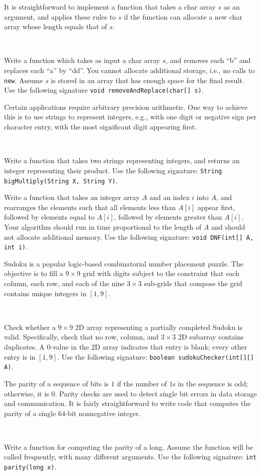 \documentclass{jhwhw}
\newcommand{\myindex}[1]{%
}
\newcommand{\task}{%
\mbox{ }\\ %
\noindent{\bf Task:}
}
\begin{document}
It is straightforward to implement a function that takes a char \myindex{string}array $s$ as an argument,
and applies these rules to $s$ if the function can allocate a new char array whose length equals that of $s$.

\task
Write a function which takes as input a \myindex{string}char array $s$, and
removes each ``b'' and replaces each ``a'' by ``dd''.
You cannot allocate additional storage, i.e., no calls to \texttt{new}.
Assume $s$ is stored in an \myindex{array}array that has enough space for the final result.
Use the following signature \texttt{void removeAndReplace(char[] s)}.


Certain applications require arbitrary precision arithmetic.
One way to achieve this is to use \myindex{string}strings to represent
integers, e.g., with one digit or negative sign per character entry, with the most significant
digit appearing first.

\task
Write a function that takes two \myindex{string}strings representing integers,
and returns an integer representing their product.
Use the following signature: \texttt{String bigMultiply(String X, String Y)}.


Write a function that takes an integer \myindex{array}array $A$ and an index $i$ into $A$,
and rearranges the elements such that all elements less than $A[i]$ appear first,
followed by elements equal to $A[i]$, followed by elements greater than $A[i]$.
Your algorithm should run in time proportional to the length of $A$ and
should not allocate additional memory.
Use the following signature: \texttt{void DNF(int[] A, int i)}.


Sudoku is a popular logic-based combinatorial number placement puzzle.
The objective is to fill a $9\times 9$ grid with digits subject to the constraint that each column,
each row, and each of the nine $3 \times 3$ sub-grids that compose the grid
contains unique integers in $[1,9]$.

\task
Check whether a $9 \times 9$ \myindex{$2$D array}$2$D array representing a partially
completed \myindex{Sudoku}Sudoku is valid. Specifically, check that
no row, column, and $3\times3$ \myindex{$2$D subarray}$2$D subarray contains duplicates.
A $0$-value in the \myindex{$2$D array}$2$D array indicates that entry is blank; every
other entry is in $[1,9]$.
Use the following signature: \texttt{boolean sudokuChecker(int[][] A)}.


The parity of a sequence of bits is $1$ if the number of $1$s in the sequence is odd; otherwise, it is $0$.
Parity checks are used to detect single bit errors in data storage and communication.
It is fairly straightforward to write code that computes the parity of a single $64$-bit nonnegative integer.

\task
Write a function for
computing the parity of a long. Assume the function will be called
frequently, with many different arguments.
Use the following signature: \texttt{int parity(long x)}.
\end{document}
